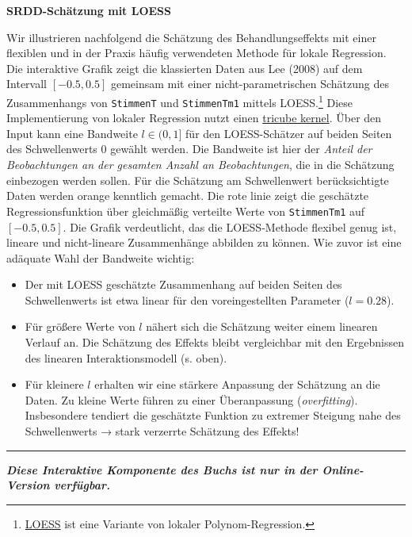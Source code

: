 \documentclass[
  a4paper,
  DIV=11,
  oneside]{scrreprt}
\begin{document}
\textbf{SRDD-Schätzung mit LOESS}

Wir illustrieren nachfolgend die Schätzung des Behandlungseffekts mit
einer flexiblen und in der Praxis häufig verwendeten Methode für lokale
Regression. Die interaktive Grafik zeigt die klassierten Daten aus Lee
(2008) auf dem Intervall \([-0.5,0.5]\) gemeinsam mit einer
nicht-parametrischen Schätzung des Zusammenhangs von \texttt{StimmenT}
und \texttt{StimmenTm1} mittels LOESS.\footnote{\href{https://en.wikipedia.org/wiki/Local_regression}{LOESS}
  ist eine Variante von lokaler Polynom-Regression.} Diese
Implementierung von lokaler Regression nutzt einen
\href{https://en.wikipedia.org/wiki/Kernel_(statistics)}{tricube
kernel}. Über den Input kann eine Bandweite \(l\in(0,1]\) für den
LOESS-Schätzer auf beiden Seiten des Schwellenwerts 0 gewählt werden.
Die Bandweite ist hier der \emph{Anteil der Beobachtungen an der
gesamten Anzahl an Beobachtungen}, die in die Schätzung einbezogen
werden sollen. Für die Schätzung am Schwellenwert berücksichtigte Daten
werden orange kenntlich gemacht. Die rote linie zeigt die geschätzte
Regressionsfunktion über gleichmäßig verteilte Werte von
\texttt{StimmenTm1} auf \([-0.5,0.5]\). Die Grafik verdeutlicht, das die
LOESS-Methode flexibel genug ist, lineare und nicht-lineare
Zusammenhänge abbilden zu können. Wie zuvor ist eine adäquate Wahl der
Bandweite wichtig:

\begin{itemize}
\item
  Der mit LOESS geschätzte Zusammenhang auf beiden Seiten des
  Schwellenwerts ist etwa linear für den voreingestellten Parameter
  (\(l = 0.28\)).
\item
  Für größere Werte von \(l\) nähert sich die Schätzung weiter einem
  linearen Verlauf an. Die Schätzung des Effekts bleibt vergleichbar mit
  den Ergebnissen des linearen Interaktionsmodell (s. oben).
\item
  Für kleinere \(l\) erhalten wir eine stärkere Anpassung der Schätzung
  an die Daten. Zu kleine Werte führen zu einer Überanpassung
  (\emph{overfitting}). Insbesondere tendiert die geschätzte Funktion zu
  extremer Steigung nahe des Schwellenwerts → stark verzerrte Schätzung
  des Effekts!
\end{itemize}

\begin{center}\rule{0.5\linewidth}{0.5pt}\end{center}

\textbf{\emph{Diese Interaktive Komponente des Buchs ist nur in der
Online-Version verfügbar.}}
\end{document}
